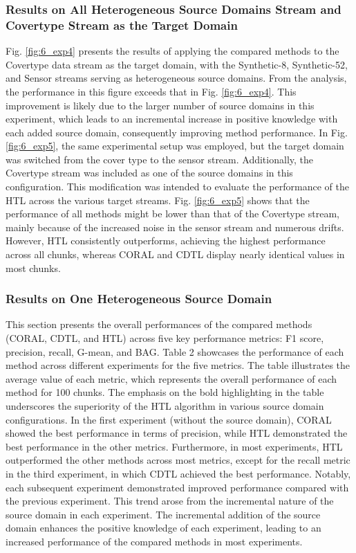 \subsubsection{Results on All Heterogeneous Source Domains Stream and Covertype Stream as the Target Domain}
Fig. \ref{fig:6_exp4} presents the results of applying the compared methods to the Covertype data stream as the target domain, with the Synthetic-8, Synthetic-52, and Sensor streams serving as heterogeneous source domains. From the analysis, the performance in this figure exceeds that in Fig. \ref{fig:6_exp4}. This improvement is likely due to the larger number of source domains in this experiment, which leads to an incremental increase in positive knowledge with each added source domain, consequently improving method performance. In Fig. \ref{fig:6_exp5}, the same experimental setup was employed, but the target domain was switched from the cover type to the sensor stream. Additionally, the Covertype stream was included as one of the source domains in this configuration. This modification was intended to evaluate the performance of the HTL across the various target streams. Fig. \ref{fig:6_exp5} shows that the performance of all methods might be lower than that of the Covertype stream, mainly because of the increased noise in the sensor stream and numerous drifts. However, HTL consistently outperforms, achieving the highest performance across all chunks, whereas CORAL and CDTL display nearly identical values in most chunks.

\subsubsection{Results on One Heterogeneous Source Domain}
This section presents the overall performances of the compared methods (CORAL, CDTL, and HTL) across five key performance metrics: F1 score, precision, recall, G-mean, and BAG. Table 2 showcases the performance of each method across different experiments for the five metrics. The table illustrates the average value of each metric, which represents the overall performance of each method for 100 chunks. The emphasis on the bold highlighting in the table underscores the superiority of the HTL algorithm in various source domain configurations. In the first experiment (without the source domain), CORAL showed the best performance in terms of precision, while HTL demonstrated the best performance in the other metrics. Furthermore, in most experiments, HTL outperformed the other methods across most metrics, except for the recall metric in the third experiment, in which CDTL achieved the best performance. Notably, each subsequent experiment demonstrated improved performance compared with the previous experiment. This trend arose from the incremental nature of the source domain in each experiment. The incremental addition of the source domain enhances the positive knowledge of each experiment, leading to an increased performance of the compared methods in most experiments.

